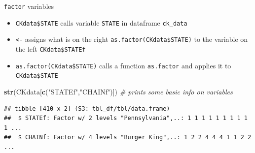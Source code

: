 \documentclass[
  ignorenonframetext,
]{beamer}
\newenvironment{Shaded}{\begin{snugshade}}{\end{snugshade}}
\newcommand{\CommentTok}[1]{\textcolor[rgb]{0.56,0.35,0.01}{\textit{#1}}}
\newcommand{\FunctionTok}[1]{\textcolor[rgb]{0.13,0.29,0.53}{\textbf{#1}}}
\newcommand{\NormalTok}[1]{#1}
\newcommand{\OtherTok}[1]{\textcolor[rgb]{0.56,0.35,0.01}{#1}}
\newcommand{\SpecialCharTok}[1]{\textcolor[rgb]{0.81,0.36,0.00}{\textbf{#1}}}
\newcommand{\StringTok}[1]{\textcolor[rgb]{0.31,0.60,0.02}{#1}}
\begin{document}
\begin{frame}[fragile]{\texttt{factor} variables}
\label{variables-1}
\footnotesize

\begin{Shaded}
\end{Shaded}

\normalsize

\begin{itemize}
  \item \texttt{CKdata\$STATE} calls variable \texttt{STATE} in dataframe \texttt{ck\_data}
  \item \texttt{<-} assigns what is on the right \texttt{as.factor(CKdata\$STATE)} to the variable on the left \texttt{CKdata\$STATEf}
  \item \texttt{as.factor(CKdata\$STATE)} calls a function \texttt{as.factor} and applies it to \texttt{CKdata\$STATE}
\end{itemize}

\footnotesize

\begin{Shaded}
\begin{Highlighting}[]
\FunctionTok{str}\NormalTok{(CKdata[}\FunctionTok{c}\NormalTok{(}\StringTok{"STATEf"}\NormalTok{,}\StringTok{"CHAINf"}\NormalTok{)])  }\CommentTok{\# prints some basic info on variables}
\end{Highlighting}
\end{Shaded}

\begin{verbatim}
## tibble [410 x 2] (S3: tbl_df/tbl/data.frame)
##  $ STATEf: Factor w/ 2 levels "Pennsylvania",..: 1 1 1 1 1 1 1 1 1 1 ...
##  $ CHAINf: Factor w/ 4 levels "Burger King",..: 1 2 2 4 4 4 1 1 2 2 ...
\end{verbatim}

\normalsize
\end{frame}
\end{document}
